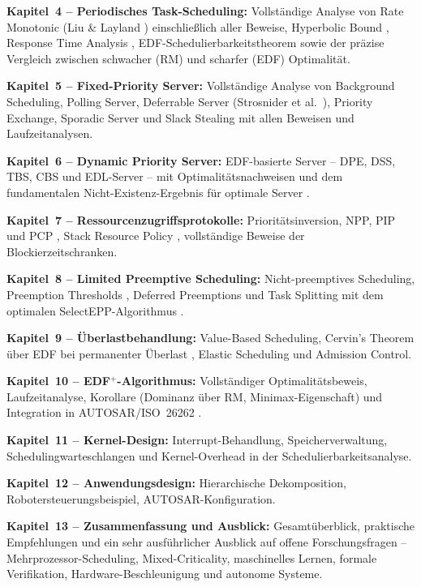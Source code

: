 ﻿\documentclass[a4paper,12pt]{report}
\theoremstyle{definition}
\begin{document}
\textbf{Kapitel~4 -- Periodisches Task-Scheduling:} Vollständige Analyse von
Rate Monotonic (Liu \& Layland \cite{Liu1973}) einschließlich aller Beweise,
Hyperbolic Bound \cite{Bini2001}, Response Time Analysis \cite{Audsley1993},
EDF-Schedulierbarkeitstheorem \cite{Baruah1990} sowie der präzise Vergleich
zwischen schwacher (RM) und scharfer (EDF) Optimalität.

\textbf{Kapitel~5 -- Fixed-Priority Server:} Vollständige Analyse von
Background Scheduling, Polling Server, Deferrable Server (Strosnider et al.\
\cite{Strosnider1995}), Priority Exchange, Sporadic Server \cite{Sprunt1989}
und Slack Stealing \cite{Lehoczky1992} mit allen Beweisen und Laufzeitanalysen.

\textbf{Kapitel~6 -- Dynamic Priority Server:} EDF-basierte Server -- DPE,
DSS, TBS, CBS \cite{Abeni1998} und EDL-Server -- mit Optimalitätsnachweisen
und dem fundamentalen Nicht-Existenz-Ergebnis für optimale Server \cite{Tia1995}.

\textbf{Kapitel~7 -- Ressourcenzugriffsprotokolle:} Prioritätsinversion, NPP,
PIP und PCP \cite{Sha1990}, Stack Resource Policy \cite{Baker1991}, vollständige
Beweise der Blockierzeitschranken.

\textbf{Kapitel~8 -- Limited Preemptive Scheduling:} Nicht-preemptives Scheduling,
Preemption Thresholds \cite{Wang1999}, Deferred Preemptions und Task Splitting
mit dem optimalen SelectEPP-Algorithmus \cite{Bertogna2011}.

\textbf{Kapitel~9 -- Überlastbehandlung:} Value-Based Scheduling, Cervin's
Theorem über EDF bei permanenter Überlast \cite{Cervin2003}, Elastic Scheduling
und Admission Control.

\textbf{Kapitel~10 -- EDF$^+$-Algorithmus:} Vollständiger Optimalitätsbeweis,
Laufzeitanalyse, Korollare (Dominanz über RM, Minimax-Eigenschaft) und
Integration in AUTOSAR/ISO~26262 \cite{Epp2026}.

\textbf{Kapitel~11 -- Kernel-Design:} Interrupt-Behandlung, Speicherverwaltung,
Schedulingwarteschlangen und Kernel-Overhead in der Schedulierbarkeitsanalyse.

\textbf{Kapitel~12 -- Anwendungsdesign:} Hierarchische Dekomposition,
Robotersteuerungsbeispiel, AUTOSAR-Konfiguration.

\textbf{Kapitel~13 -- Zusammenfassung und Ausblick:} Gesamtüberblick,
praktische Empfehlungen und ein sehr ausführlicher Ausblick auf offene
Forschungsfragen -- Mehrprozessor-Scheduling, Mixed-Criticality, maschinelles
Lernen, formale Verifikation, Hardware-Beschleunigung und autonome Systeme.
\end{document}
